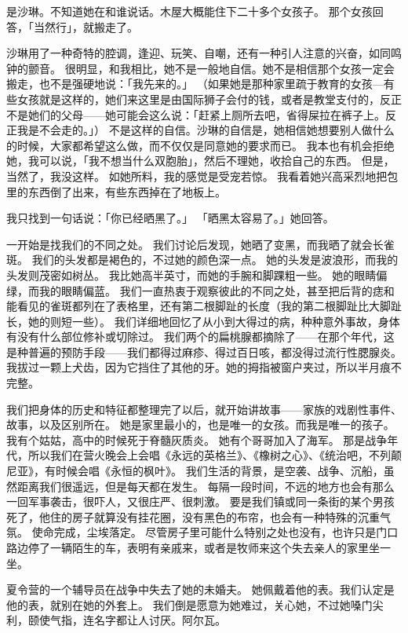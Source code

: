 \documentclass[UTF8]{ctexart}
\begin{document}
是沙琳。不知道她在和谁说话。木屋大概能住下二十多个女孩子。
那个女孩回答，「当然行」，就搬走了。

沙琳用了一种奇特的腔调，逢迎、玩笑、自嘲，还有一种引人注意的兴奋，如同鸣钟的颤音。
很明显，和我相比，她不是一般地自信。她不是相信那个女孩一定会搬走，也不是强硬地说：「我先来的。」
（如果她是那种家里疏于教育的女孩—有些女孩就是这样的，她们来这里是由国际狮子会付的钱，或者是教堂支付的，反正不是她们的父母——她可能会这么说：「赶紧上厕所去吧，省得屎拉在裤子上。反正我是不会走的。」）
不是这样的自信。沙琳的自信是，她相信她想要别人做什么的时候，大家都希望这么做，而不仅仅是同意她的要求而已。
我本也有机会拒绝她，我可以说，「我不想当什么双胞胎」，然后不理她，收拾自己的东西。
但是，当然了，我没这样。
如她所料，我的感觉是受宠若惊。
我看着她兴高采烈地把包里的东西倒了出来，有些东西掉在了地板上。

我只找到一句话说：「你已经晒黑了。」
「晒黑太容易了。」她回答。

一开始是找我们的不同之处。
我们讨论后发现，她晒了变黑，而我晒了就会长雀斑。
我们的头发都是褐色的，不过她的颜色深一点。
她的头发是波浪形，而我的头发则茂密如树丛。
我比她高半英寸，而她的手腕和脚踝粗一些。
她的眼睛偏绿，而我的眼睛偏蓝。
我们一直热衷于观察彼此的不同之处，甚至把后背的痣和能看见的雀斑都列在了表格里，还有第二根脚趾的长度（我的第二根脚趾比大脚趾长，她的则短一些）。
我们详细地回忆了从小到大得过的病，种种意外事故，身体有没有什么部位修补或切除过。
我们两个的扁桃腺都摘除了——在那个年代，这是种普遍的预防手段——我们都得过麻疹、得过百日咳，都没得过流行性腮腺炎。
我拔过一颗上犬齿，因为它挡住了其他的牙。她的拇指被窗户夹过，所以半月痕不完整。

我们把身体的历史和特征都整理完了以后，就开始讲故事——家族的戏剧性事件、故事，以及区别所在。
她是家里最小的，也是唯一的女孩。而我是唯一的孩子。
我有个姑姑，高中的时候死于脊髓灰质炎。
她有个哥哥加入了海军。
那是战争年代，所以我们在营火晚会上会唱《永远的英格兰》、《橡树之心》、《统治吧，不列颠尼亚》，有时候会唱《永恒的枫叶》。
我们生活的背景，是空袭、战争、沉船，虽然距离我们很遥远，但是每天都在发生。
每隔一段时间，不远的地方也会有那么一回军事袭击，很吓人，又很庄严、很刺激。
要是我们镇或同一条街的某个男孩死了，他住的房子就算没有挂花圈，没有黑色的布帘，也会有一种特殊的沉重气氛。
使命完成，尘埃落定。
尽管房子里可能什么特别之处也没有，也许只是门口路边停了一辆陌生的车，表明有亲戚来，或者是牧师来这个失去亲人的家里坐一坐。

夏令营的一个辅导员在战争中失去了她的未婚夫。
她佩戴着他的表。我们认定是他的表，就别在她的外套上。
我们倒是愿意为她难过，关心她，不过她嗓门尖利，颐使气指，连名字都让人讨厌。阿尔瓦。
\end{document}
